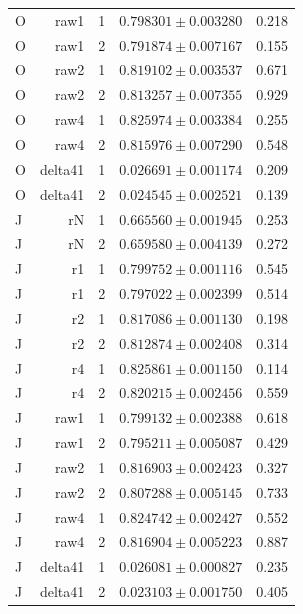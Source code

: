 {\begin{longtable}{lrrrr}
O & raw1 & 1 & $0.798301\pm0.003280$ & 0.218\\
O & raw1 & 2 & $0.791874\pm0.007167$ & 0.155\\
O & raw2 & 1 & $0.819102\pm0.003537$ & 0.671\\
O & raw2 & 2 & $0.813257\pm0.007355$ & 0.929\\
O & raw4 & 1 & $0.825974\pm0.003384$ & 0.255\\
O & raw4 & 2 & $0.815976\pm0.007290$ & 0.548\\
O & delta41 & 1 & $0.026691\pm0.001174$ & 0.209\\
O & delta41 & 2 & $0.024545\pm0.002521$ & 0.139\\
J & rN & 1 & $0.665560\pm0.001945$ & 0.253\\
J & rN & 2 & $0.659580\pm0.004139$ & 0.272\\
J & r1 & 1 & $0.799752\pm0.001116$ & 0.545\\
J & r1 & 2 & $0.797022\pm0.002399$ & 0.514\\
J & r2 & 1 & $0.817086\pm0.001130$ & 0.198\\
J & r2 & 2 & $0.812874\pm0.002408$ & 0.314\\
J & r4 & 1 & $0.825861\pm0.001150$ & 0.114\\
J & r4 & 2 & $0.820215\pm0.002456$ & 0.559\\
J & raw1 & 1 & $0.799132\pm0.002388$ & 0.618\\
J & raw1 & 2 & $0.795211\pm0.005087$ & 0.429\\
J & raw2 & 1 & $0.816903\pm0.002423$ & 0.327\\
J & raw2 & 2 & $0.807288\pm0.005145$ & 0.733\\
J & raw4 & 1 & $0.824742\pm0.002427$ & 0.552\\
J & raw4 & 2 & $0.816904\pm0.005223$ & 0.887\\
J & delta41 & 1 & $0.026081\pm0.000827$ & 0.235\\
J & delta41 & 2 & $0.023103\pm0.001750$ & 0.405\\
\end{longtable}}
